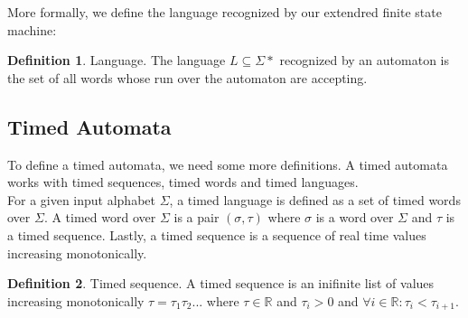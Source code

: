 \documentclass[12pt]{article}
\theoremstyle{definition}
\newtheorem{definition}{Definition}[section]
\theoremstyle{definition}
\newcommand{\R}{\mathbb{R}}
\begin{document}
More formally, we define the language recognized by our extendred finite state machine:
\theoremstyle{definition}
\begin{definition}{Language.} The language $L \subseteq \Sigma*$ recognized by an automaton is the set of all words whose run over the automaton are accepting.
\end{definition}

%
%
%

\subsection{Timed Automata}

To define a timed automata, we need some more definitions. A timed automata works with timed sequences, timed words and timed languages.\\

For a given input alphabet $\Sigma$, a timed language is defined as a set of timed words over $\Sigma$. A timed word over $\Sigma$ is a pair $(\sigma, \tau)$ where $\sigma$ is a word over $\Sigma$ and $\tau$ is a timed sequence. Lastly, a timed sequence is a sequence of real time values increasing monotonically.~\cite{ALUR1994183}

\theoremstyle{definition}
\begin{definition}{Timed sequence.}
A timed sequence is an inifinite list of values increasing monotonically $\tau = \tau_1 \tau_2 ...$ where $\tau \in \R$ and $\tau_i > 0$ and $\forall i \in \R: \tau_i < \tau_{i+1}$.
\end{definition}
\end{document}
